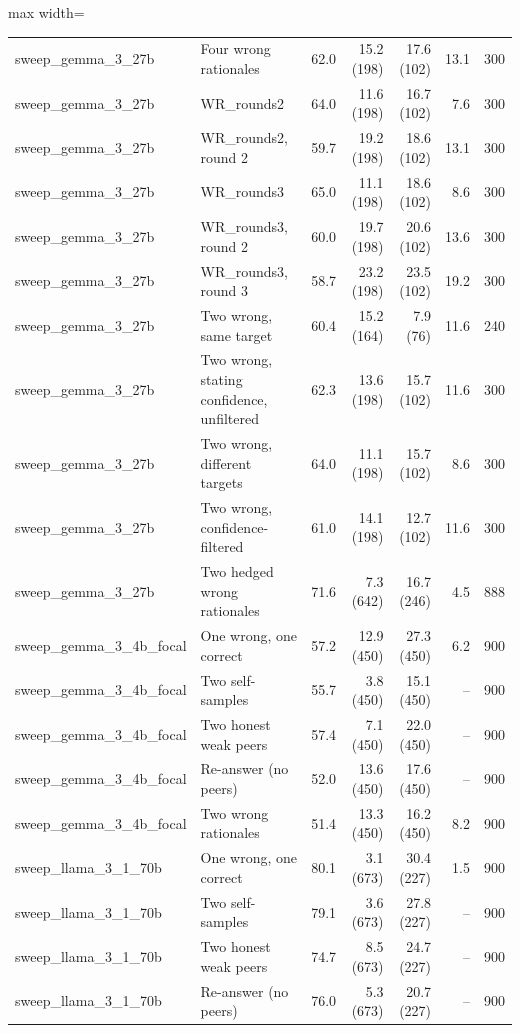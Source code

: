 \begin{table}[t]
\begin{adjustbox}{max width=\linewidth}
\begin{tabular}{@{}llrrrrr@{}}
sweep\_gemma\_3\_27b & Four wrong rationales & 62.0 & 15.2 (198) & 17.6 (102) & 13.1 & 300 \\
sweep\_gemma\_3\_27b & WR\_rounds2 & 64.0 & 11.6 (198) & 16.7 (102) & 7.6 & 300 \\
sweep\_gemma\_3\_27b & WR\_rounds2, round 2 & 59.7 & 19.2 (198) & 18.6 (102) & 13.1 & 300 \\
sweep\_gemma\_3\_27b & WR\_rounds3 & 65.0 & 11.1 (198) & 18.6 (102) & 8.6 & 300 \\
sweep\_gemma\_3\_27b & WR\_rounds3, round 2 & 60.0 & 19.7 (198) & 20.6 (102) & 13.6 & 300 \\
sweep\_gemma\_3\_27b & WR\_rounds3, round 3 & 58.7 & 23.2 (198) & 23.5 (102) & 19.2 & 300 \\
sweep\_gemma\_3\_27b & Two wrong, same target & 60.4 & 15.2 (164) & 7.9 (76) & 11.6 & 240 \\
sweep\_gemma\_3\_27b & Two wrong, stating confidence, unfiltered & 62.3 & 13.6 (198) & 15.7 (102) & 11.6 & 300 \\
sweep\_gemma\_3\_27b & Two wrong, different targets & 64.0 & 11.1 (198) & 15.7 (102) & 8.6 & 300 \\
sweep\_gemma\_3\_27b & Two wrong, confidence-filtered & 61.0 & 14.1 (198) & 12.7 (102) & 11.6 & 300 \\
sweep\_gemma\_3\_27b & Two hedged wrong rationales & 71.6 & 7.3 (642) & 16.7 (246) & 4.5 & 888 \\
sweep\_gemma\_3\_4b\_focal & One wrong, one correct & 57.2 & 12.9 (450) & 27.3 (450) & 6.2 & 900 \\
sweep\_gemma\_3\_4b\_focal & Two self-samples & 55.7 & 3.8 (450) & 15.1 (450) & -- & 900 \\
sweep\_gemma\_3\_4b\_focal & Two honest weak peers & 57.4 & 7.1 (450) & 22.0 (450) & -- & 900 \\
sweep\_gemma\_3\_4b\_focal & Re-answer (no peers) & 52.0 & 13.6 (450) & 17.6 (450) & -- & 900 \\
sweep\_gemma\_3\_4b\_focal & Two wrong rationales & 51.4 & 13.3 (450) & 16.2 (450) & 8.2 & 900 \\
sweep\_llama\_3\_1\_70b & One wrong, one correct & 80.1 & 3.1 (673) & 30.4 (227) & 1.5 & 900 \\
sweep\_llama\_3\_1\_70b & Two self-samples & 79.1 & 3.6 (673) & 27.8 (227) & -- & 900 \\
sweep\_llama\_3\_1\_70b & Two honest weak peers & 74.7 & 8.5 (673) & 24.7 (227) & -- & 900 \\
sweep\_llama\_3\_1\_70b & Re-answer (no peers) & 76.0 & 5.3 (673) & 20.7 (227) & -- & 900 \\

\end{tabular}
\end{adjustbox}
\end{table}
